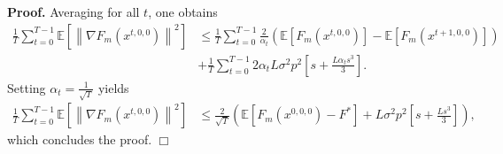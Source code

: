 \documentclass[11pt,a4paper]{article}
\numberwithin{equation}{section}%
\newenvironment{proof}[1][Proof]{\noindent \textbf{#1.} }{\hfill$\Box$\par\medskip}
\renewcommand{\(}{\left (}
\renewcommand{\)}{\right )}
\newcommand{\Lphif}{L}
\newcommand{\Fm}{F_m}
\begin{document}
\begin{proof}
Averaging for all $t$, one obtains
\begin{align*}
\frac{1}{T}\sum_{t=0}^{T-1} \mathbb{E} \left[\left\| \nabla \Fm(x^{t,0,0})  \right\|^2 \right] 
&\leq  \frac{1}{T}\sum_{t=0}^{T-1} \frac{2}{\alpha_t} \left(   \mathbb{E} [\Fm(x^{t,0,0})] - \mathbb{E} [\Fm(x^{t+1,0,0})] \right) \\
&+ \frac{1}{T}\sum_{t=0}^{T-1} 2\alpha_t \Lphif \sigma^2 p^2\left[s + \frac{\Lphif \alpha_t  s^3}{3}\right].
\end{align*}
Setting $\alpha_t = \frac{1}{\sqrt{T}}$ yields
\begin{align*}
\frac{1}{T}\sum_{t=0}^{T-1}  \mathbb{E} \left[\left\| \nabla \Fm(x^{t,0,0})  \right\|^2 \right] 
&\leq  \frac{2}{\sqrt{T}} \left(\mathbb{E} [\Fm(x^{0,0,0})- F^*]  + \Lphif \sigma^2 p^2\left[s + \frac{\Lphif s^3}{3}\right]\right),
\end{align*}
which concludes the proof.  
\end{proof}
\end{document}
